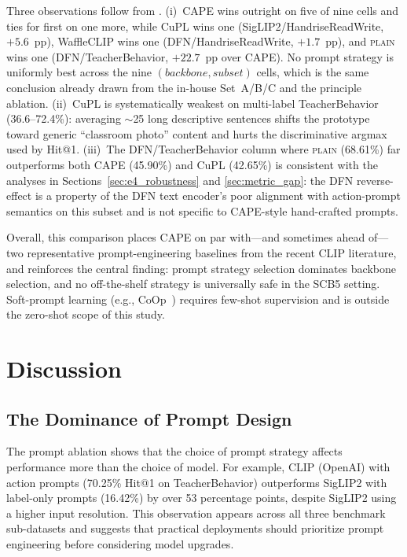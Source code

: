 \documentclass[symmetry,article,submit,pdftex,moreauthors]{Definitions/mdpi}
\begin{document}
Three observations follow from . (i)~CAPE wins outright on five of nine cells and ties for first on one more, while CuPL wins one (SigLIP2/HandriseReadWrite, $+5.6$~pp), WaffleCLIP wins one (DFN/HandriseReadWrite, $+1.7$~pp), and \textsc{plain} wins one (DFN/TeacherBehavior, $+22.7$~pp over CAPE). No prompt strategy is uniformly best across the nine $(backbone, subset)$ cells, which is the same conclusion already drawn from the in-house Set~A/B/C and the principle ablation. (ii)~CuPL is systematically weakest on multi-label TeacherBehavior (36.6--72.4\%): averaging $\sim$25 long descriptive sentences shifts the prototype toward generic ``classroom photo'' content and hurts the discriminative argmax used by Hit@1. (iii)~The DFN/TeacherBehavior column where \textsc{plain} (68.61\%) far outperforms both CAPE (45.90\%) and CuPL (42.65\%) is consistent with the analyses in Sections~\ref{sec:e4_robustness} and \ref{sec:metric_gap}: the DFN reverse-effect is a property of the DFN text encoder's poor alignment with action-prompt semantics on this subset and is not specific to CAPE-style hand-crafted prompts.

Overall, this comparison places CAPE on par with---and sometimes ahead of---two representative prompt-engineering baselines from the recent CLIP literature, and reinforces the central finding: prompt strategy selection dominates backbone selection, and no off-the-shelf strategy is universally safe in the SCB5 setting. Soft-prompt learning (e.g., CoOp~\cite{zhou2022learning}) requires few-shot supervision and is outside the zero-shot scope of this study.


\section{Discussion}
\label{sec:discussion}

\subsection{The Dominance of Prompt Design}

The prompt ablation shows that the choice of prompt strategy affects performance more than the choice of model.
For example, CLIP (OpenAI) with action prompts (70.25\% Hit@1 on TeacherBehavior) outperforms SigLIP2 with label-only prompts (16.42\%) by over 53 percentage points, despite SigLIP2 using a higher input resolution.
This observation appears across all three benchmark sub-datasets and suggests that practical deployments should prioritize prompt engineering before considering model upgrades.
\end{document}
